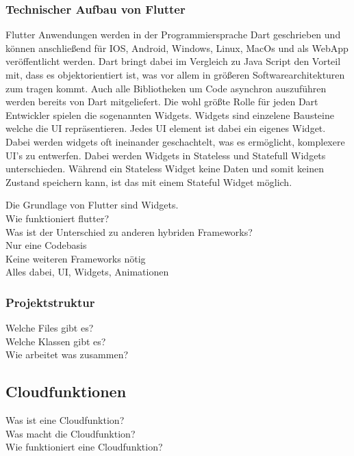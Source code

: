 \subsubsection{Technischer Aufbau von Flutter}
Flutter Anwendungen werden in der Programmiersprache Dart geschrieben und können anschließend für IOS, Android, Windows, Linux, MacOs und als WebApp 
veröffentlicht werden. Dart bringt dabei im Vergleich zu Java Script den Vorteil mit, dass es objektorientiert ist, was vor allem in größeren 
Softwarearchitekturen zum tragen kommt. Auch alle Bibliotheken um Code asynchron auszuführen werden bereits von Dart mitgeliefert. 
Die wohl größte Rolle für jeden Dart Entwickler spielen die sogenannten Widgets. Widgets sind einzelene Bausteine welche die UI repräsentieren. 
Jedes UI element ist dabei ein eigenes Widget. Dabei werden widgets oft ineinander geschachtelt, was es ermöglicht, komplexere UI’s zu entwerfen. 
Dabei werden Widgets in Stateless und Statefull Widgets unterschieden. Während ein Stateless Widget keine Daten und somit keinen Zustand speichern kann, 
ist das mit einem Stateful Widget möglich.

Die Grundlage von Flutter sind Widgets. \\
Wie funktioniert flutter?   \\
Was ist der Unterschied zu anderen hybriden Frameworks?  \\ 
Nur eine Codebasis \\
Keine weiteren Frameworks nötig\\
Alles dabei, UI, Widgets, Animationen\\

\subsubsection{Projektstruktur}
Welche Files gibt es? \\
Welche Klassen gibt es? \\
Wie arbeitet was zusammen? \\

\subsection{Cloudfunktionen}
Was ist eine Cloudfunktion? \\
Was macht die Cloudfunktion? \\
Wie funktioniert eine Cloudfunktion? \\

